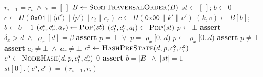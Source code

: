 \documentclass[twocolumn]{article}
\begin{document}
\begin{algorithm}[t!]
  \caption{Stack-machine verification of the RSMT consistency proof (operand-domain checks omitted)}\label{alg:stackverify-core}
  \footnotesize
  \begin{algorithmic}[0]
        \State \Return $r_{i-1} = r_i \;\land\; \pi = [\,]$
      \EndIf
      \State $B \gets \Call{SortTraversalOrder}{B}$
      \State $\mathit{st} \gets [\,]$; \quad $b \gets 0$ 
         
          \State {}
         
          \State $c \gets H(\texttt{0x01} \| \langle d'\rangle \| \langle p'\rangle \| c_l \| c_r)$
          \State {}
         
          \State $c \gets H(\texttt{0x00} \| k' \| v')$
          \State {}
         
          \State $(k, v) \gets B[b]$; \quad $b \gets b + 1$
          \State {}
         
          \State $(c^{\mathsf o}_r, c^{\mathsf n}_r, a_r) \gets \Call{Pop}{\mathit{st}}$
          \State $(c^{\mathsf o}_l, c^{\mathsf n}_l, a_l) \gets \Call{Pop}{\mathit{st}}$
          \State $p \gets \bot$
             
              \State \textbf{assert} $\delta_x > d \;\land\; \varrho_x[d] = \beta$
              \State \textbf{assert} $p = \bot \;\lor\; p = \varrho_x[0..d)$
              \State $p \gets \varrho_x[0..d)$
            \EndIf
          \EndFor
          \State \textbf{assert} $p \neq \bot$
           
            \State \textbf{assert} $a_l \neq \bot \;\land\; a_r \neq \bot$
          \EndIf
          \State $c^{\mathsf o} \gets \Call{HashPreState}{d,p,c^{\mathsf o}_l,c^{\mathsf o}_r}$
          \State $c^{\mathsf n} \gets \Call{NodeHash}{d,p,c^{\mathsf n}_l,c^{\mathsf n}_r}$
          \State {}
        \Else
          \State \Return $0$ 
        \EndIf
      \EndFor
      \State \textbf{assert} $b = |B| \;\land\; |\mathit{st}| = 1$
      \State \Return $\mathit{st}[0].(c^{\mathsf o}, c^{\mathsf n}) = (r_{i-1}, r_i)$
    \EndFunction
  \end{algorithmic}
\end{algorithm}
\end{document}
